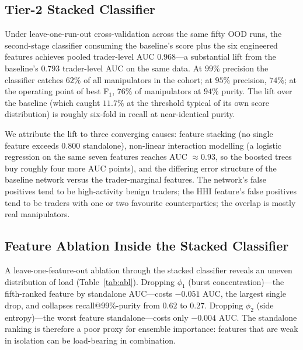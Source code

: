\documentclass[10pt,twocolumn,letterpaper]{article}
\begin{document}
\subsection{Tier-2 Stacked Classifier}
Under leave-one-run-out cross-validation across the same fifty OOD
runs, the second-stage classifier consuming the baseline's score plus
the six engineered features achieves pooled trader-level AUC
\(0.968\)---a substantial lift from the baseline's \(0.793\)
trader-level AUC on the same data. At \(99\%\) precision the
classifier catches \(62\%\) of all manipulators in the cohort; at
\(95\%\) precision, \(74\%\); at the operating point of best F\(_1\),
\(76\%\) of manipulators at \(94\%\) purity. The lift over the
baseline (which caught \(11.7\%\) at the threshold typical of its own
score distribution) is roughly six-fold in recall at near-identical
purity.

We attribute the lift to three converging causes: feature stacking
(no single feature exceeds \(0.800\) standalone), non-linear
interaction modelling (a logistic regression on the same seven
features reaches AUC \(\approx 0.93\), so the boosted trees buy
roughly four more AUC points), and the differing error structure of
the baseline network versus the trader-marginal features. The
network's false positives tend to be high-activity benign traders; the
HHI feature's false positives tend to be traders with one or two
favourite counterparties; the overlap is mostly real manipulators.

\subsection{Feature Ablation Inside the Stacked Classifier}
\label{sec:ablate}
A leave-one-feature-out ablation through the stacked classifier
reveals an uneven distribution of load (Table~\ref{tab:abl}). Dropping
\(\phi_1\) (burst concentration)---the fifth-ranked feature by
standalone AUC---costs \(-0.051\) AUC, the largest single drop, and
collapses recall@99\%-purity from \(0.62\) to \(0.27\). Dropping
\(\phi_2\) (side entropy)---the worst feature standalone---costs only
\(-0.004\) AUC. The standalone ranking is therefore a poor proxy for
ensemble importance: features that are weak in isolation can be
load-bearing in combination.
\end{document}
